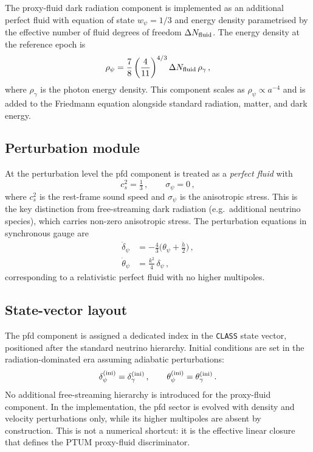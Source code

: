 \documentclass[epj]{svjour}
\begin{document}
The proxy-fluid dark radiation component is implemented as an
additional perfect fluid with equation of state $w_\psi=1/3$ and
energy density parametrised by the effective number of fluid
degrees of freedom $\Delta N_{\rm fluid}$. The energy density at
the reference epoch is
\begin{equation}
\rho_\psi
= \frac{7}{8}\left(\frac{4}{11}\right)^{4/3}
  \Delta N_{\rm fluid}\,\rho_\gamma\,,
\label{eq:rho_pfd_app}
\end{equation}
where $\rho_\gamma$ is the photon energy density. This component
scales as $\rho_\psi\propto a^{-4}$ and is added to the Friedmann
equation alongside standard radiation, matter, and dark energy.

\subsection{Perturbation module}

At the perturbation level the pfd component is treated as a
\emph{perfect fluid} with
\begin{equation}
c_s^2 = \tfrac{1}{3}\,,\qquad \sigma_\psi = 0\,,
\label{eq:pfd_pert_app}
\end{equation}
where $c_s^2$ is the rest-frame sound speed and $\sigma_\psi$ is
the anisotropic stress. This is the key distinction from
free-streaming dark radiation (e.g.\ additional neutrino species),
which carries non-zero anisotropic stress. The perturbation
equations in synchronous gauge are
\begin{align}
\dot{\delta}_\psi
  &= -\tfrac{4}{3}\bigl(\theta_\psi+\tfrac{\dot{h}}{2}\bigr)\,,
\label{eq:delta_pfd_app}\\[4pt]
\dot{\theta}_\psi
  &= \tfrac{k^2}{4}\,\delta_\psi\,,
\label{eq:theta_pfd_app}
\end{align}
corresponding to a relativistic perfect fluid with no higher
multipoles.

\subsection{State-vector layout}

The pfd component is assigned a dedicated index in the
\texttt{CLASS} state vector, positioned after the standard
neutrino hierarchy. Initial conditions are set in the
radiation-dominated era assuming adiabatic perturbations:
\begin{equation}
\delta_\psi^{(\rm ini)} = \delta_\gamma^{(\rm ini)}\,,
\qquad
\theta_\psi^{(\rm ini)} = \theta_\gamma^{(\rm ini)}\,.
\end{equation}
No additional free-streaming hierarchy is introduced for the proxy-fluid
component. In the implementation, the pfd sector is evolved with density and
velocity perturbations only, while its higher multipoles are absent by
construction. This is not a numerical shortcut: it is the effective linear
closure that defines the PTUM proxy-fluid discriminator.
\end{document}
